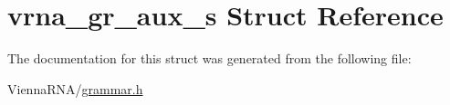 \hypertarget{structvrna__gr__aux__s}{}\section{vrna\+\_\+gr\+\_\+aux\+\_\+s Struct Reference}
\label{structvrna__gr__aux__s}


The documentation for this struct was generated from the following file\+:\begin{DoxyCompactItemize}
\item 
Vienna\+R\+N\+A/\mbox{\hyperlink{grammar_8h}{grammar.\+h}}\end{DoxyCompactItemize}
